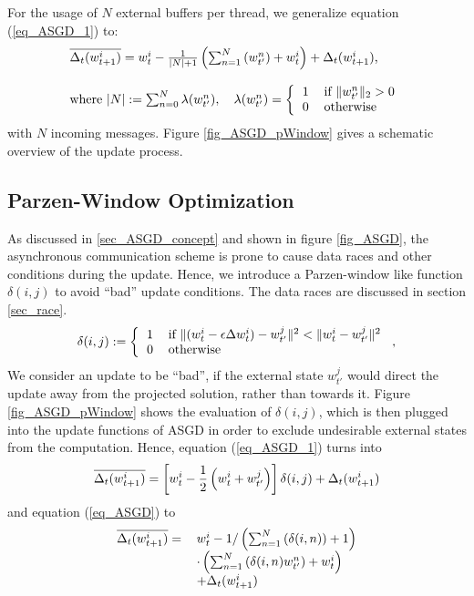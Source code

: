 \documentclass{acm_proc_article-sp}
\begin{document}
For the usage of $N$ external buffers per thread, we generalize equation (\ref{eq_ASGD_1}) to:
\begin{equation}
\begin{tabular}{l}
$\overline{\Delta_t(w^i_{t+1})}=w^i_t-{1\over |N|+1}\left( \sum_{n=1}^N\left(w^n_{t'}\right) 
    + w^i_t  \right) + \Delta_t(w^i_{t+1})$,\\
\quad\\where $|N|:=\sum_{n=0}^N \lambda(w^n_{t'}), \quad \lambda(w^n_{t'})= \left\{
\begin{tabular}{ll}
  $1$ & if $\|w^n_{t'}\|_2>0$ \\
  $0$ & otherwise 
\end{tabular}
\right.$
\end{tabular}
\label{eq_ASGD}
\end{equation}
with $N$ incoming messages. Figure \ref{fig_ASGD_pWindow} gives a schematic overview 
of the update process.

\subsection{{Parzen-Window} Optimization}
As discussed in \ref{sec_ASGD_concept} 
and shown in figure \ref{fig_ASGD}, the asynchronous communication scheme is prone 
to cause data races and other conditions during the update. Hence, we introduce a 
Parzen-window like function $\delta(i,j)$ to avoid ``bad'' update conditions. The data 
races are discussed in section \ref{sec_race}. 
\begin{equation}
\delta(i,j) := \left\{
\begin{tabular}{ll}
  $1$ & if $\|(w^i_t-\epsilon\Delta w^i_t)-w^j_{t'}\|^2 < \|w^i_t-w^j_{t'}\|^2$ \\
  $0$ & otherwise 
\end{tabular}
\right.,
\label{eq_Parzen}
\end{equation}
We consider an update to be ``bad'', if the external state $w^j_{t'}$ would direct
the update away from the projected solution, rather than towards it. Figure
\ref{fig_ASGD_pWindow} shows the evaluation of $\delta(i,j)$,
which is then plugged into the update functions of ASGD in order to exclude 
undesirable external states from the computation. Hence, equation (\ref{eq_ASGD_1}) 
turns into
\begin{equation}
\overline{\Delta_t(w^i_{t+1})}=\left[w^i_t-{1\over 2}\left( w^i_t + w^j_{t'} \right)\right]
\delta(i,j) + \Delta_t(w^i_{t+1})
\label{eq_ASGD_1_Parzen}
\end{equation}
and equation (\ref{eq_ASGD}) to
\begin{equation}
\begin{tabular}{rl}
$\overline{\Delta_t(w^i_{t+1})}=$&$w^i_t-1/\left(\sum_{n=1}^N\left(\delta(i,n)\right)+1\right)$\\
&$\cdot\left( \sum_{n=1}^N\left(\delta(i,n)w^n_{t'}\right) + w^i_t  \right)$\\
&$ + \Delta_t(w^i_{t+1})$
\end{tabular}
\label{eq_ASGD_Parzen}
\end{equation}
\end{document}
